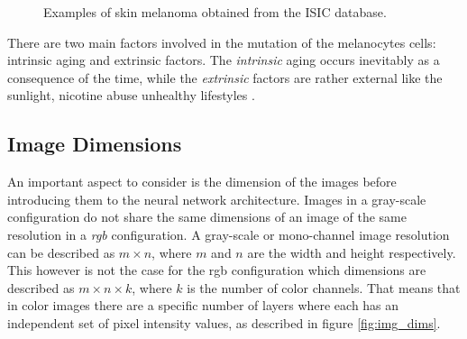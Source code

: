 \begin{figure}[h]
  \centering
  \hspace{-0.4cm}
  \caption{Examples of skin melanoma obtained from the ISIC \citep{isic_skin} database.}
\end{figure}

There are two main factors involved in the mutation of the melanocytes cells: intrinsic aging and extrinsic factors. The \emph{intrinsic} aging occurs inevitably as a consequence of the time, while the \emph{extrinsic} factors are rather external like the sunlight, nicotine abuse unhealthy lifestyles \citep{farage2008intrinsic}.

\subsection{Image Dimensions}
An important aspect to consider is the dimension of the images before introducing them to the neural network architecture. Images in a gray-scale configuration do not share the same dimensions of an image of the same resolution in a \emph{rgb} configuration. A gray-scale or mono-channel image resolution can be described as $m \times n$, where $m$ and $n$ are the width and height respectively. This however is not the case for the rgb configuration which dimensions are described as $m \times n \times k$, where $k$ is the number of color channels. That means that in color images there are a specific number of layers where each has an independent set of pixel intensity values, as described in figure \ref{fig:img_dims}.

